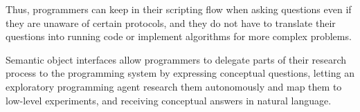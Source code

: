 Thus, programmers can keep in their scripting flow when asking questions even if they are unaware of certain protocols, and they do not have to translate their questions into running code or implement algorithms for more complex problems.

\ParSep

Semantic object interfaces allow programmers to delegate parts of their research process to the programming system by expressing conceptual questions, letting an exploratory programming agent research them autonomously and map them to low-level experiments, and receiving conceptual answers in natural language.
